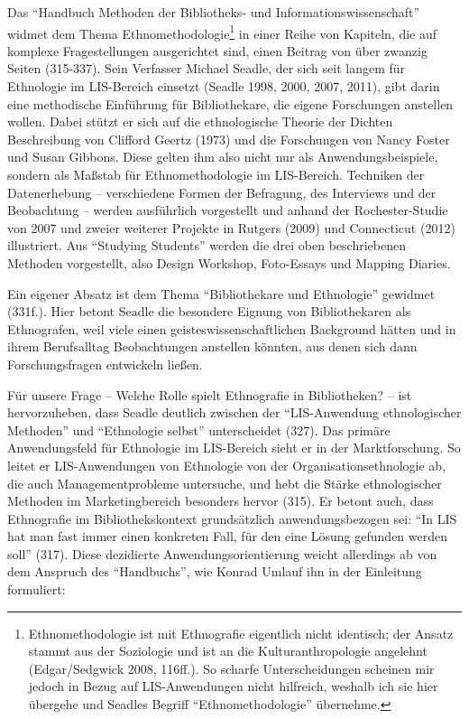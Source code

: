 \documentclass[a4paper,
fontsize=11pt,
oneside,
numbers=noperiodatend,
parskip=half-,
bibliography=totoc,
final
]{scrartcl}
\begin{document}
Das \enquote{Handbuch Methoden der Bibliotheks- und
Informationswissenschaft} widmet dem Thema Ethnomethodologie\footnote{Ethnomethodologie
  ist mit Ethnografie eigentlich nicht identisch; der Ansatz stammt aus
  der Soziologie und ist an die Kulturanthropologie angelehnt
  (Edgar/Sedgwick 2008, 116ff.). So scharfe Unterscheidungen scheinen
  mir jedoch in Bezug auf LIS-Anwendungen nicht hilfreich, weshalb ich
  sie hier übergehe und Seadles Begriff \enquote{Ethnomethodologie}
  übernehme.} in einer Reihe von Kapiteln, die auf komplexe
Fragestellungen ausgerichtet sind, einen Beitrag von über zwanzig Seiten
(315-337). Sein Verfasser Michael Seadle, der sich seit langem für
Ethnologie im LIS-Bereich einsetzt (Seadle 1998, 2000, 2007, 2011), gibt
darin eine methodische Einführung für Bibliothekare, die eigene
Forschungen anstellen wollen. Dabei stützt er sich auf die ethnologische
Theorie der Dichten Beschreibung von Clifford Geertz (1973) und die
Forschungen von Nancy Foster und Susan Gibbons. Diese gelten ihm also
nicht nur als Anwendungsbeispiele, sondern als Maßstab für
Ethnomethodologie im LIS-Bereich. Techniken der Datenerhebung --
verschiedene Formen der Befragung, des Interviews und der Beobachtung --
werden ausführlich vorgestellt und anhand der Rochester-Studie von 2007
und zweier weiterer Projekte in Rutgers (2009) und Connecticut (2012)
illustriert. Aus \enquote{Studying Students} werden die drei oben
beschriebenen Methoden vorgestellt, also Design Workshop, Foto-Essays
und Mapping Diaries.

Ein eigener Absatz ist dem Thema \enquote{Bibliothekare und Ethnologie}
gewidmet (331f.). Hier betont Seadle die besondere Eignung von
Bibliothekaren als Ethnografen, weil viele einen
geisteswissenschaftlichen Background hätten und in ihrem Berufsalltag
Beobachtungen anstellen könnten, aus denen sich dann Forschungsfragen
entwickeln ließen.

Für unsere Frage -- Welche Rolle spielt Ethnografie in Bibliotheken? --
ist hervorzuheben, dass Seadle deutlich zwischen der
\enquote{LIS-Anwendung ethnologischer Methoden} und \enquote{Ethnologie
selbst} unterscheidet (327). Das primäre Anwendungsfeld für Ethnologie
im LIS-Bereich sieht er in der Marktforschung. So leitet er
LIS-Anwendungen von Ethnologie von der Organisationsethnologie ab, die
auch Managementprobleme untersuche, und hebt die Stärke ethnologischer
Methoden im Marketingbereich besonders hervor (315). Er betont auch,
dass Ethnografie im Bibliothekskontext grundsätzlich anwendungsbezogen
sei: \enquote{In LIS hat man fast immer einen konkreten Fall, für den
eine Lösung gefunden werden soll} (317). Diese dezidierte
Anwendungsorientierung weicht allerdings ab von dem Anspruch des
\enquote{Handbuchs}, wie Konrad Umlauf ihn in der Einleitung formuliert:
\end{document}
